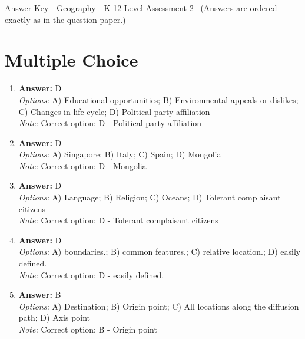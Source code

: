 \documentclass[12pt]{article}
\begin{document}
\begin{center}
Answer Key - Geography - K-12 Level Assessment 2 \
\small (Answers are ordered exactly as in the question paper.)
\end{center}

\section*{Multiple Choice}
\begin{enumerate}[label=\arabic*.]
\item \textbf{Answer:} D
\\ \textit{Options:} A) Educational opportunities; B) Environmental appeals or dislikes; C) Changes in life cycle; D) Political party affiliation
\\ \textit{Note:} Correct option: D - Political party affiliation
\item \textbf{Answer:} D
\\ \textit{Options:} A) Singapore; B) Italy; C) Spain; D) Mongolia
\\ \textit{Note:} Correct option: D - Mongolia
\item \textbf{Answer:} D
\\ \textit{Options:} A) Language; B) Religion; C) Oceans; D) Tolerant complaisant citizens
\\ \textit{Note:} Correct option: D - Tolerant complaisant citizens
\item \textbf{Answer:} D
\\ \textit{Options:} A) boundaries.; B) common features.; C) relative location.; D) easily defined.
\\ \textit{Note:} Correct option: D - easily defined.
\item \textbf{Answer:} B
\\ \textit{Options:} A) Destination; B) Origin point; C) All locations along the diffusion path; D) Axis point
\\ \textit{Note:} Correct option: B - Origin point
\end{enumerate}
\end{document}
